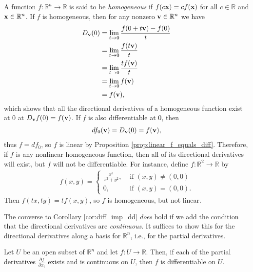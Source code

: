 \documentclass[12pt,letterpaper,reqno]{article}
\numberwithin{equation}{section}
\newcommand{\R}{\ensuremath{\mathbb R}}
\newcommand{\bv}{{\bf v}}
\newcommand{\bx}{{\bf x}}
\begin{document}
{\begin{example}
	A function $f:\R^n \to \R$ is said to be \emph{homogeneous} if $f(c\bx)=cf(\bx)$ for all $c \in \R$ and $\bx \in \R^n$. If $f$ is homogeneous, then for any nonzero $\bv \in \R^n$ we have
	\begin{align*}
		D_\bv(0)&=\lim_{t \to 0}\frac{f(0+t\bv)-f(0)}{t}\\
		&=\lim_{t \to 0}\frac{f(t\bv)}{t}\\
		&=\lim_{t \to 0}\frac{tf(\bv)}{t}\\
		&=\lim_{t \to 0}f(\bv)\\
		&=f(\bv),
	\end{align*}
	which shows that all the directional derivatives of a homogeneous function exist at 0 at $D_\bv f(0)=f(\bv)$. If $f$ is also differentiable at $0$, then
	\begin{align*}
		df_0(\bv)=D_\bv(0)=f(\bv),
	\end{align*}
thus $f=df_0$, so $f$ is linear by Proposition \ref{prop:linear_f_equals_diff}. Therefore, if $f$ is any nonlinear homogeneous function, then all of its directional derivatives will exist, but $f$ will not be differentiable. For instance, define $f:\R^2 \to \R$ by
\begin{align*}
	f(x,y)=\begin{cases}
		\frac{x^3}{x^2+y^2}, &\text{ if } (x,y)
 \neq (0,0) \\
 0, &\text{ if } (x,y)=(0,0).
 	\end{cases}
\end{align*} 
Then $f(tx,ty)=tf(x,y)$, so $f$ is homogeneous, but not linear.
\end{example}

The converse to Corollary \ref{cor:diff_imp_dd} \emph{does} hold if we add the condition that the directional derivatives are \emph{continuous}. It suffices to show this for the directional derivatives along a basis for $\R^n$, i.e., for the partial derivatives.

\begin{thm}
	Let $U$ be an open subset of $\mathbb{R}^n$ and let $f:U \to \mathbb{R}$. Then, if each of the partial derivatives $\frac{\partial f}{\partial x_i}$ exists and is continuous on $U$, then $f$ is differentiable on $U$.
\end{thm}

}
\end{document}
